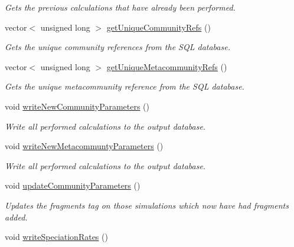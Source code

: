 \begin{DoxyCompactItemize}
\begin{DoxyCompactList}\small\item\em Gets the previous calculations that have already been performed. \end{DoxyCompactList}\item 
vector$<$ unsigned long $>$ \hyperlink{class_community_aed61108d8c4fd42d39a9112c5062cad4}{get\+Unique\+Community\+Refs} ()
\begin{DoxyCompactList}\small\item\em Gets the unique community references from the S\+QL database. \end{DoxyCompactList}\item 
vector$<$ unsigned long $>$ \hyperlink{class_community_a257e8e3dce33b235985ed9d167817a89}{get\+Unique\+Metacommunity\+Refs} ()
\begin{DoxyCompactList}\small\item\em Gets the unique metacommunity reference from the S\+QL database. \end{DoxyCompactList}\item 
void \hyperlink{class_community_afbc8709084a00a7450e3a168cb016db9}{write\+New\+Community\+Parameters} ()\hypertarget{class_community_afbc8709084a00a7450e3a168cb016db9}{}\label{class_community_afbc8709084a00a7450e3a168cb016db9}

\begin{DoxyCompactList}\small\item\em Write all performed calculations to the output database. \end{DoxyCompactList}\item 
void \hyperlink{class_community_ac900c23ffe2572504fca11f20b7ba8cd}{write\+New\+Metacommunty\+Parameters} ()\hypertarget{class_community_ac900c23ffe2572504fca11f20b7ba8cd}{}\label{class_community_ac900c23ffe2572504fca11f20b7ba8cd}

\begin{DoxyCompactList}\small\item\em Write all performed calculations to the output database. \end{DoxyCompactList}\item 
void \hyperlink{class_community_af3f5939bfb59fdf3b7d7b5f3699bd225}{update\+Community\+Parameters} ()\hypertarget{class_community_af3f5939bfb59fdf3b7d7b5f3699bd225}{}\label{class_community_af3f5939bfb59fdf3b7d7b5f3699bd225}

\begin{DoxyCompactList}\small\item\em Updates the fragments tag on those simulations which now have had fragments added. \end{DoxyCompactList}\item 
void \hyperlink{class_community_adcfc04e92cbb597682dcc1f2913d6668}{write\+Speciation\+Rates} ()\hypertarget{class_community_adcfc04e92cbb597682dcc1f2913d6668}{}\label{class_community_adcfc04e92cbb597682dcc1f2913d6668}


\end{DoxyCompactItemize}

